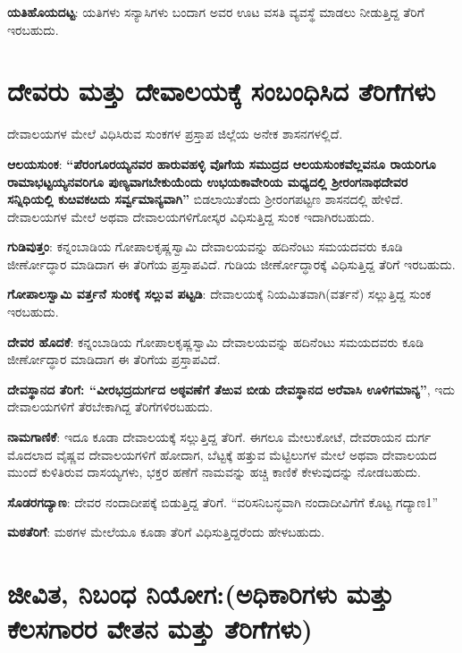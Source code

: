 \textbf{ಯತಿಹೊಯದಟ್ಟ}: ಯತಿಗಳು ಸನ್ಯಾಸಿಗಳು ಬಂದಾಗ ಅವರ ಊಟ ವಸತಿ ವ್ಯವಸ್ಥೆ ಮಾಡಲು ನೀಡುತ್ತಿದ್ದ ತೆರಿಗೆ ಇರಬಹುದು.


\section{ದೇವರು ಮತ್ತು ದೇವಾಲಯಕ್ಕೆ ಸಂಬಂಧಿಸಿದ ತೆರಿಗೆಗಳು}

ದೇವಾಲಯಗಳ ಮೇಲೆ ವಿಧಿಸಿರುವ ಸುಂಕಗಳ ಪ್ರಸ್ತಾಪ ಜಿಲ್ಲೆಯ ಅನೇಕ ಶಾಸನಗಳಲ್ಲಿದೆ.

\textbf{ಆಲಯಸುಂಕ}: \textbf{“ಪೆರಂಗೂರಯ್ಯನವರ ಹಾರುವಹಳ್ಳಿ ವೊಗೆಯ ಸಮುದ್ರದ ಆಲಯಸುಂಕವೆಲ್ಲವನೂ\general{\break } ರಾಯರಿಗೂ ರಾಮಾಭಟ್ಟಯ್ಯನವರಿಗೂ ಪುಣ್ಯವಾಗಬೇಕುಯೆಂದು ಉಭಯಕಾವೇರಿಯ ಮಧ್ಯದಲ್ಲಿ ಶ‍್ರೀರಂಗನಾಥದೇವರ ಸನ್ನಿಧಿಯಲ್ಲಿ ಕುೞವಕೞದು ಸರ್ವ್ವಮಾನ್ಯವಾಗಿ”} ಬಿಡಲಾಯಿತೆಂದು ಶ‍್ರೀರಂಗಪಟ್ಟಣ ಶಾಸನದಲ್ಲಿ ಹೇಳಿದೆ. ದೇವಾಲಯಗಳ ಮೇಲೆ ಅಥವಾ ದೇವಾಲಯಗಳಿಗೋಸ್ಕರ ವಿಧಿಸುತ್ತಿದ್ದ ಸುಂಕ ಇದಾಗಿರಬಹುದು.

\textbf{ಗುಡಿವುತ್ತಂ}: ಕನ್ನಂಬಾಡಿಯ ಗೋಪಾಲಕೃಷ್ಣಸ್ವಾಮಿ ದೇವಾಲಯವನ್ನು ಹದಿನೆಂಟು ಸಮಯದವರು ಕೂಡಿ ಜೀರ್ಣೋದ್ಧಾರ ಮಾಡಿದಾಗ ಈ ತೆರಿಗೆಯ ಪ್ರಸ್ತಾಪವಿದೆ. ಗುಡಿಯ ಜೀರ್ಣೋದ್ಧಾರಕ್ಕೆ ವಿಧಿಸುತ್ತಿದ್ದ ತೆರಿಗೆ ಇರಬಹುದು.

\textbf{ಗೋಪಾಲಸ್ವಾಮಿ ವರ್ತ್ತನೆ ಸುಂಕಕ್ಕೆ ಸಲ್ಲುವ ಪಟ್ಟಡಿ}: ದೇವಾಲಯಕ್ಕೆ ನಿಯಮಿತವಾಗಿ(ವರ್ತನೆ) ಸಲ್ಲುತ್ತಿದ್ದ ಸುಂಕ ಇರಬಹುದು.

\textbf{ದೇವರ ಹೊದಕೆ}: ಕನ್ನಂಬಾಡಿಯ ಗೋಪಾಲಕೃಷ್ಣಸ್ವಾಮಿ ದೇವಾಲಯವನ್ನು ಹದಿನೆಂಟು ಸಮಯದವರು ಕೂಡಿ ಜೀರ್ಣೋದ್ಧಾರ ಮಾಡಿದಾಗ ಈ ತೆರಿಗೆಯ ಪ್ರಸ್ತಾಪವಿದೆ.

\textbf{ದೇವಸ್ಥಾನದ ತೆರಿಗೆ: “ವೀರಭದ್ರದುರ್ಗದ ಅಠ್ಠವಣೆಗೆ ತೆಱುವ ಬೀಡು ದೇವಸ್ಥಾನದ ಅರೆವಾಸಿ ಊಳಿಗಮಾನ್ಯ”}, ಇದು ದೇವಾಲಯಗಳಿಗೆ ತೆರಬೇಕಾಗಿದ್ದ ತೆರಿಗೆಗಳಿರಬಹುದು.

\textbf{ನಾಮಗಾಣಿಕೆ}: ಇದೂ ಕೂಡಾ ದೇವಾಲಯಕ್ಕೆ ಸಲ್ಲುತ್ತಿದ್ದ ತೆರಿಗೆ. ಈಗಲೂ ಮೇಲುಕೋಟೆ, ದೇವರಾಯನ ದುರ್ಗ ಮೊದಲಾದ ವೈಷ್ಣವ ದೇವಾಲಯಗಳಿಗೆ ಹೋದಾಗ, ಬೆಟ್ಟಕ್ಕೆ ಹತ್ತುವ ಮೆಟ್ಟಿಲುಗಳ ಮೇಲೆ ಅಥವಾ ದೇವಾಲಯದ ಮುಂದೆ ಕುಳಿತಿರುವ ದಾಸಯ್ಯಗಳು, ಭಕ್ತರ ಹಣೆಗೆ ನಾಮವನ್ನು ಹಚ್ಚಿ ಕಾಣಿಕೆ ಕೇಳುವುದನ್ನು ನೋಡಬಹುದು.

\textbf{ಸೊಡರಗದ್ಯಾಣ}: ದೇವರ ನಂದಾದೀಪಕ್ಕೆ ಬಿಡುತ್ತಿದ್ದ ತೆರಿಗೆ. “ವರಿಸನಿಬನ್ಧವಾಗಿ ನಂದಾದೀವಿಗೆಗೆ ಕೊಟ್ಟ ಗದ್ಯಾಣ1”

\textbf{ಮಠತೆರಿಗೆ}: ಮಠಗಳ ಮೇಲೆಯೂ ಕೂಡಾ ತೆರಿಗೆ ವಿಧಿಸುತ್ತಿದ್ದರೆಂದು ಹೇಳಬಹುದು.


\section{ಜೀವಿತ, ನಿಬಂಧ ನಿಯೋಗ:(ಅಧಿಕಾರಿಗಳು ಮತ್ತು ಕೆಲಸಗಾರರ ವೇತನ ಮತ್ತು ತೆರಿಗೆಗಳು)}

